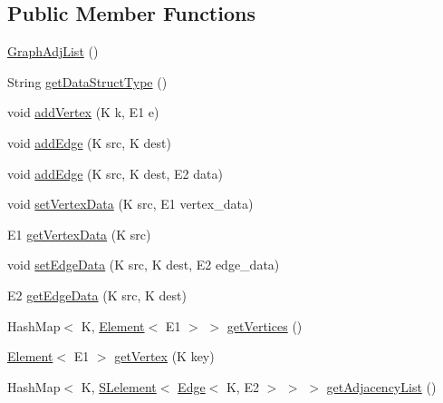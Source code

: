 \subsection*{Public Member Functions}
\begin{DoxyCompactItemize}
\item 
\mbox{\hyperlink{classbridges_1_1base_1_1_graph_adj_list_aba7e066f43d361418ae6bdf53a23b1de}{Graph\+Adj\+List}} ()
\item 
String \mbox{\hyperlink{classbridges_1_1base_1_1_graph_adj_list_a40c4a2faf20c9847e8ba0d8024236a4b}{get\+Data\+Struct\+Type}} ()
\item 
void \mbox{\hyperlink{classbridges_1_1base_1_1_graph_adj_list_aca59a3c40af4ae82716ebbfa1751f267}{add\+Vertex}} (K k, E1 e)
\item 
void \mbox{\hyperlink{classbridges_1_1base_1_1_graph_adj_list_a43041976184920e1db1dbe3ad696c6cd}{add\+Edge}} (K src, K dest)
\item 
void \mbox{\hyperlink{classbridges_1_1base_1_1_graph_adj_list_aa9fa3cbb6a90de43ee6f0d59c8dce329}{add\+Edge}} (K src, K dest, E2 data)
\item 
void \mbox{\hyperlink{classbridges_1_1base_1_1_graph_adj_list_aa80bfbbe9c4dd130632db1e1165d635e}{set\+Vertex\+Data}} (K src, E1 vertex\+\_\+data)
\item 
E1 \mbox{\hyperlink{classbridges_1_1base_1_1_graph_adj_list_a3d5f73795bcd5011c425eaca33383454}{get\+Vertex\+Data}} (K src)
\item 
void \mbox{\hyperlink{classbridges_1_1base_1_1_graph_adj_list_a48041b13b10d5fb677f48a0debfc268e}{set\+Edge\+Data}} (K src, K dest, E2 edge\+\_\+data)
\item 
E2 \mbox{\hyperlink{classbridges_1_1base_1_1_graph_adj_list_a13cdc7ed89fb211f47e2b04da0b65561}{get\+Edge\+Data}} (K src, K dest)
\item 
Hash\+Map$<$ K, \mbox{\hyperlink{classbridges_1_1base_1_1_element}{Element}}$<$ E1 $>$ $>$ \mbox{\hyperlink{classbridges_1_1base_1_1_graph_adj_list_acd53b2393db0936ad5812997f67ee1ee}{get\+Vertices}} ()
\item 
\mbox{\hyperlink{classbridges_1_1base_1_1_element}{Element}}$<$ E1 $>$ \mbox{\hyperlink{classbridges_1_1base_1_1_graph_adj_list_aa19cd300a85b05352bdf58720310a112}{get\+Vertex}} (K key)
\item 
Hash\+Map$<$ K, \mbox{\hyperlink{classbridges_1_1base_1_1_s_lelement}{S\+Lelement}}$<$ \mbox{\hyperlink{classbridges_1_1base_1_1_edge}{Edge}}$<$ K, E2 $>$ $>$ $>$ \mbox{\hyperlink{classbridges_1_1base_1_1_graph_adj_list_a77771e356aa8bf44525be9ae01603989}{get\+Adjacency\+List}} ()

\end{DoxyCompactItemize}
